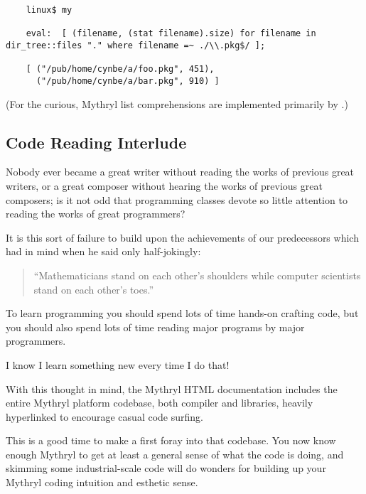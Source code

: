 \begin{verbatim}
    linux$ my

    eval:  [ (filename, (stat filename).size) for filename in dir_tree::files "." where filename =~ ./\\.pkg$/ ];

    [ ("/pub/home/cynbe/a/foo.pkg", 451), 
      ("/pub/home/cynbe/a/bar.pkg", 910) ]
\end{verbatim}

(For the curious, Mythryl list comprehensions are implemented primarily by 
.)

\cutend*


\subsection{Code Reading Interlude}

Nobody ever became a great writer without reading the works 
of previous great writers, or a great composer without hearing 
the works of previous great composers;  is it not odd that 
programming classes devote so little attention to reading the 
works of great programmers?

It is this sort of failure to build upon the achievements of our 
predecessors which 
 had in mind when he said 
only half-jokingly:

\begin{quote}
       ``Mathematicians stand on each other's shoulders while computer scientists stand on each other's toes.''\newline
\end{quote}

To learn programming you should spend lots of  
time hands-on crafting code, but you should also spend 
lots of time reading major programs by major programmers.

I know I learn something new every time I do that!

With this thought in mind, the Mythryl {\sc HTML} documentation 
includes the entire Mythryl platform codebase, both compiler and 
libraries, heavily hyperlinked to encourage casual code surfing.

This is a good time to make a first foray into that codebase. 
You now know enough Mythryl to get at least a general sense 
of what the code is doing, and skimming some industrial-scale 
code will do wonders for building up your Mythryl coding 
intuition and esthetic sense.

